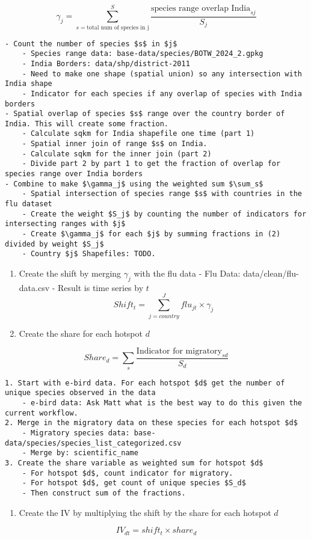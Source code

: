 \documentclass[
  letterpaper,
]{article}
\providecommand{\tightlist}{%
  \setlength{\itemsep}{0pt}\setlength{\parskip}{0pt}}\usepackage{longtable,booktabs,array}
\begin{document}
\begin{tcolorbox}
\[
\gamma_j = \sum_{s =\text{total num of species in j}}^S \frac{\text{species range overlap India}_{sj}}{S_j}
\]

\begin{verbatim}
- Count the number of species $s$ in $j$
    - Species range data: base-data/species/BOTW_2024_2.gpkg
    - India Borders: data/shp/district-2011
    - Need to make one shape (spatial union) so any intersection with India shape
    - Indicator for each species if any overlap of species with India borders
- Spatial overlap of species $s$ range over the country border of India. This will create some fraction. 
    - Calculate sqkm for India shapefile one time (part 1)
    - Spatial inner join of range $s$ on India. 
    - Calculate sqkm for the inner join (part 2)
    - Divide part 2 by part 1 to get the fraction of overlap for species range over India borders
- Combine to make $\gamma_j$ using the weighted sum $\sum_s$
    - Spatial intersection of species range $s$ with countries in the flu dataset
    - Create the weight $S_j$ by counting the number of indicators for intersecting ranges with $j$
    - Create $\gamma_j$ for each $j$ by summing fractions in (2) divided by weight $S_j$
    - Country $j$ Shapefiles: TODO.
\end{verbatim}

\begin{enumerate}
\def\labelenumi{\arabic{enumi}.}
\setcounter{enumi}{2}
\item
  Create the shift by merging \(\gamma_j\) with the flu data - Flu Data:
  data/clean/flu-data.csv - Result is time series by \(t\) \[
  Shift_t = \sum_{j = country}^J flu_{jt} \times \gamma_j
  \]
\item
  Create the share for each hotspot \(d\)
\end{enumerate}

\[
Share_d =  \sum_s \frac{\text{Indicator for migratory}_{sd}}{S_d}
\]

\begin{verbatim}
1. Start with e-bird data. For each hotspot $d$ get the number of unique species observed in the data
    - e-bird data: Ask Matt what is the best way to do this given the current workflow. 
2. Merge in the migratory data on these species for each hotspot $d$
    - Migratory species data: base-data/species/species_list_categorized.csv
    - Merge by: scientific_name
3. Create the share variable as weighted sum for hotspot $d$
    - For hotspot $d$, count indicator for migratory. 
    - For hotspot $d$, get count of unique species $S_d$
    - Then construct sum of the fractions. 
\end{verbatim}

\begin{enumerate}
\def\labelenumi{\arabic{enumi}.}
\setcounter{enumi}{4}
\tightlist
\item
  Create the IV by multiplying the shift by the share for each hotspot
  \(d\)
\end{enumerate}

\[
IV_{dt} = shift_t \times share_d
\]

\end{tcolorbox}
\end{document}
